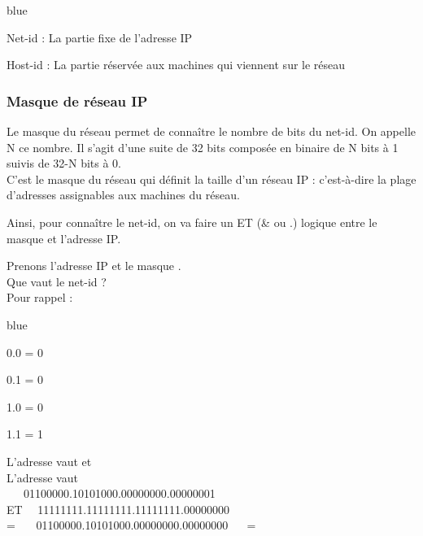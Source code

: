 {\begin{items}{blue}{\Bullet}
	\item Net-id : La partie fixe de l'adresse IP
	\item Host-id : La partie réservée aux machines qui viennent sur le réseau
\end{items}


\subsubsection{Masque de réseau IP}

Le masque du réseau permet de connaître le nombre de bits du net-id. On appelle N ce nombre. Il s’agit d’une suite de 32 bits 
composée en binaire de N bits à 1 suivis de 32-N bits à 0.\\
C’est le masque du réseau qui définit la taille d’un réseau IP : c’est-à-dire la plage d’adresses assignables aux machines du réseau.

Ainsi, pour connaître le net-id, on va faire un ET (\& ou .) logique entre le masque et l'adresse IP.

\begin{exemple}

	Prenons l'adresse IP  et le masque . \\ Que vaut le net-id ? \\
	Pour rappel : 
	\begin{items}{blue}{\Triangle}
		\item 0.0 = 0
		\item 0.1 = 0
		\item 1.0 = 0
		\item 1.1 = 1
	\end{items}

\end{exemple}

	
\begin{solution}
	
	L'adresse  vaut  et \\
L'adresse  vaut  \\


~~~01100000.10101000.00000000.00000001 \\
ET
~~11111111.11111111.11111111.00000000 \\
=
~~~01100000.10101000.00000000.00000000 ~~ = ~~ \\


\end{solution}}
